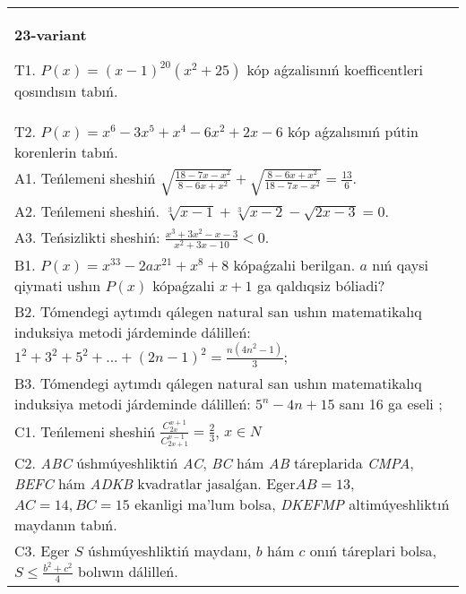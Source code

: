\documentclass{article}
\begin{document}
\begin{tabular}{m{17cm}}
\textbf{23-variant}
\newline

T1. \(P(x) = (x - 1)^{20}\left( x^{2} + 25 \right)\) kóp aǵzalisınıń koefficentleri qosındısın tabıń. \\
T2. \(P(x) = x^{6} - 3x^{5} + x^{4} - 6x^{2} + 2x - 6\) kóp aǵzalısınıń pútin korenlerin tabıń. \\
A1. Teńlemeni sheshiń \(\sqrt{\frac{18 - 7x - x^{2}}{8 - 6x + x^{2}}} + \sqrt{\frac{8 - 6x + x^{2}}{18 - 7x - x^{2}}} = \frac{13}{6}\). \\
A2. Teńlemeni sheshiń. \(\sqrt[3]{x - 1} + \sqrt[3]{x - 2} - \sqrt{2x - 3} = 0\). \\
A3. Teńsizlikti sheshiń: \(\frac{x^{3} + 3x^{2} - x - 3}{x^{2} + 3x - 10} < 0\). \\
B1. \(P(x) = x^{33} - 2ax^{21} + x^{8} + 8\) kópaǵzalıi berilgan. \(a\) nıń qaysi qiymati ushın \(P(x)\) kópaǵzalıi \(x + 1\) ga qaldıqsiz bóliadi? \\
B2. Tómendegi aytımdı qálegen natural san ushın matematikalıq induksiya metodi járdeminde dálilleń: \(1^{2} + 3^{2} + 5^{2} + ... + (2n - 1)^{2} = \frac{n\left( 4n^{2} - 1 \right)}{3}\); \\
B3. Tómendegi aytımdı qálegen natural san ushın matematikalıq induksiya metodi járdeminde dálilleń: \(5^{n} - 4n + 15\) sanı 16 ga eseli ; \\
C1. Teńlemeni sheshiń \(\frac{C_{2x}^{x + 1}}{C_{2x + 1}^{x - 1}} = \frac{2}{3}\), \(x \in N\) \\
C2. \emph{ABC} úshmúyeshliktiń \emph{AC}, \emph{BC} hám \emph{AB} táreplarida \emph{CMPA}, \emph{BEFC} hám \emph{ADKB} kvadratlar jasalǵan. Eger\(AB = 13\), \(AC = 14,BC = 15\) ekanligi ma'lum bolsa, \emph{DKEFMP} altimúyeshliktıń maydanın tabıń. \\
C3. Eger \(S\) úshmúyeshliktiń maydanı, \(b\) hám \(c\) onıń táreplari bolsa, \(S \leq \frac{b^{2} + c^{2}}{4}\) bolıwın dálilleń. \\

\end{tabular}
\vspace{1cm}
\end{document}
